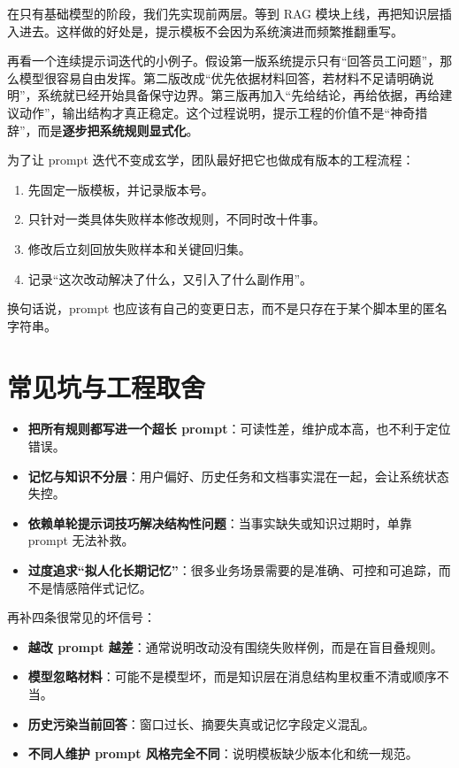 在只有基础模型的阶段，我们先实现前两层。等到 RAG 模块上线，再把知识层插入进去。这样做的好处是，提示模板不会因为系统演进而频繁推翻重写。

再看一个连续提示词迭代的小例子。假设第一版系统提示只有“回答员工问题”，那么模型很容易自由发挥。第二版改成“优先依据材料回答，若材料不足请明确说明”，系统就已经开始具备保守边界。第三版再加入“先给结论，再给依据，再给建议动作”，输出结构才真正稳定。这个过程说明，提示工程的价值不是“神奇措辞”，而是\textbf{逐步把系统规则显式化}。

为了让 prompt 迭代不变成玄学，团队最好把它也做成有版本的工程流程：
\begin{enumerate}
  \item 先固定一版模板，并记录版本号。
  \item 只针对一类具体失败样本修改规则，不同时改十件事。
  \item 修改后立刻回放失败样本和关键回归集。
  \item 记录“这次改动解决了什么，又引入了什么副作用”。
\end{enumerate}

换句话说，prompt 也应该有自己的变更日志，而不是只存在于某个脚本里的匿名字符串。

\section{常见坑与工程取舍}
\begin{itemize}
  \item \textbf{把所有规则都写进一个超长 prompt}：可读性差，维护成本高，也不利于定位错误。
  \item \textbf{记忆与知识不分层}：用户偏好、历史任务和文档事实混在一起，会让系统状态失控。
  \item \textbf{依赖单轮提示词技巧解决结构性问题}：当事实缺失或知识过期时，单靠 prompt 无法补救。
  \item \textbf{过度追求“拟人化长期记忆”}：很多业务场景需要的是准确、可控和可追踪，而不是情感陪伴式记忆。
\end{itemize}

再补四条很常见的坏信号：
\begin{itemize}
  \item \textbf{越改 prompt 越差}：通常说明改动没有围绕失败样例，而是在盲目叠规则。
  \item \textbf{模型忽略材料}：可能不是模型坏，而是知识层在消息结构里权重不清或顺序不当。
  \item \textbf{历史污染当前回答}：窗口过长、摘要失真或记忆字段定义混乱。
  \item \textbf{不同人维护 prompt 风格完全不同}：说明模板缺少版本化和统一规范。
\end{itemize}

